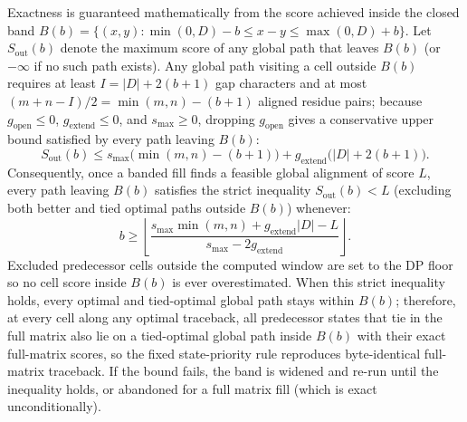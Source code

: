 \documentclass[11pt,a4paper]{article}
\begin{document}
Exactness is guaranteed mathematically from the score achieved inside the closed band $B(b) = \{(x, y) : \min(0, D) - b \le x - y \le \max(0, D) + b\}$. Let $S_{\text{out}}(b)$ denote the maximum score of any global path that leaves $B(b)$ (or $-\infty$ if no such path exists). Any global path visiting a cell outside $B(b)$ requires at least $I = |D| + 2(b + 1)$ gap characters and at most $(m + n - I)/2 = \min(m, n) - (b + 1)$ aligned residue pairs; because $g_{\text{open}} \le 0$, $g_{\text{extend}} \le 0$, and $s_{\max} \ge 0$, dropping $g_{\text{open}}$ gives a conservative upper bound satisfied by every path leaving $B(b)$:
\begin{equation}
  S_{\text{out}}(b) \le s_{\max}\big(\min(m, n) - (b + 1)\big) + g_{\text{extend}}\big(|D| + 2(b + 1)\big).
\end{equation}
Consequently, once a banded fill finds a feasible global alignment of score $L$, every path leaving $B(b)$ satisfies the strict inequality $S_{\text{out}}(b) < L$ (excluding both better and tied optimal paths outside $B(b)$) whenever:
\begin{equation}
  b \ge \left\lfloor \frac{s_{\max}\min(m, n) + g_{\text{extend}}|D| - L}{s_{\max} - 2 g_{\text{extend}}} \right\rfloor.
\end{equation}
Excluded predecessor cells outside the computed window are set to the DP floor so no cell score inside $B(b)$ is ever overestimated. When this strict inequality holds, every optimal and tied-optimal global path stays within $B(b)$; therefore, at every cell along any optimal traceback, all predecessor states that tie in the full matrix also lie on a tied-optimal global path inside $B(b)$ with their exact full-matrix scores, so the fixed state-priority rule reproduces byte-identical full-matrix traceback. If the bound fails, the band is widened and re-run until the inequality holds, or abandoned for a full matrix fill (which is exact unconditionally).
\end{document}
